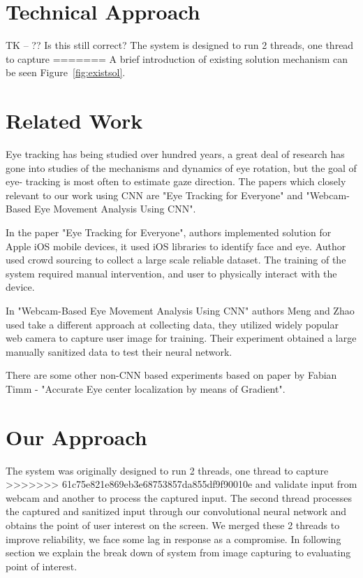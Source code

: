 \documentclass[10pt,twocolumn,letterpaper]{article}
\begin{document}
\section{Technical Approach}
TK -- ?? Is this still correct?
The system is designed to run 2 threads, one thread to capture 
=======
A brief introduction of existing solution mechanism can be seen Figure~\ref{fig:existsol}.
\section{Related Work}
Eye tracking has being studied over hundred years, a great deal of research has gone into studies of the mechanisms and dynamics of eye rotation, but the goal of eye- tracking is most often to estimate gaze direction.  The papers which closely relevant to our work using CNN are "Eye Tracking for Everyone"\cite{krafka} and "Webcam-Based Eye Movement Analysis Using CNN"\cite{zhaomeng}.

In the paper "Eye Tracking for Everyone", authors implemented solution for Apple iOS mobile devices, it used iOS libraries to identify face and eye. Author used crowd sourcing to collect a large scale reliable dataset. The training of the system required manual intervention, and user to physically interact with the device. 

In "Webcam-Based Eye Movement Analysis Using CNN" authors Meng and Zhao used take a different approach at collecting data, they utilized widely popular web camera to capture user image for training. Their experiment obtained a large manually sanitized data to test their neural network. 

There are some other non-CNN based experiments based on paper by Fabian Timm - "Accurate Eye center localization by means of Gradient". 

\section{Our Approach}
The system was originally  designed to run 2 threads, one thread to capture 
>>>>>>> 61c75e821e869eb3e68753857da855df9f90010e
and validate input from webcam and another to process the 
captured input. The second thread processes the captured and 
sanitized input through our convolutional neural network and 
obtains the point of user interest on the screen. We merged these 2 threads to improve reliability, we face some lag in response as a compromise. In following section we explain the break down of system from image capturing  to evaluating point of interest.  
\end{document}
